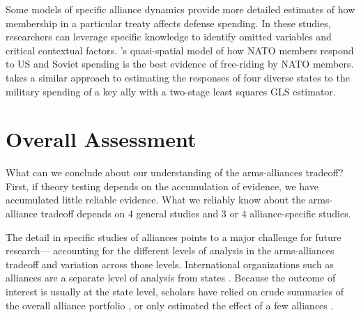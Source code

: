 \documentclass[12pt]{article}
\begin{document}
Some models of specific alliance dynamics provide more detailed estimates of how membership in a particular treaty affects defense spending. In these studies, researchers can leverage specific knowledge to identify omitted variables and critical contextual factors. \citet{PluemperNeumayer2015}'s quasi-spatial model of how NATO members respond to US and Soviet spending is the best evidence of free-riding by NATO members. \citet{Sorokin1994} takes a similar approach to estimating the responses of four diverse states to the military spending of a key ally with a two-stage least squares GLS estimator. 



\section*{Overall Assessment}

What can we conclude about our understanding of the arms-alliances tradeoff? First, if theory testing depends on the accumulation of evidence, we have accumulated little reliable evidence. What we reliably know about the arms-alliance tradeoff depends on 4 general studies and 3 or 4 alliance-specific studies. 

The detail in specific studies of alliances points to a major challenge for future research--- accounting for the different levels of analysis in the arms-alliances tradeoff and variation across those levels. International organizations such as alliances are a separate level of analysis from states \citep{Mattes2012, Chibaetal2015}. Because the outcome of interest is usually at the state level, scholars have relied on crude summaries of the overall alliance portfolio \citep{Conybeare1992}, or only estimated the effect of a few alliances \citep{OnealWhatley1996}. 






%  
 
\end{document}
